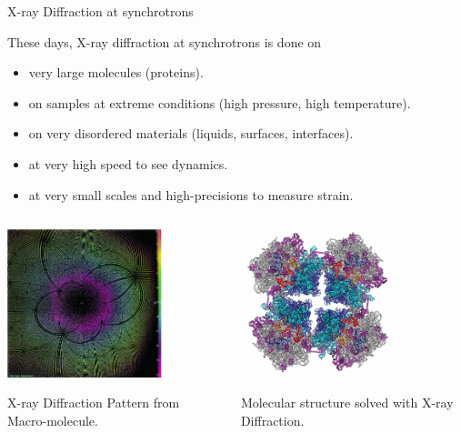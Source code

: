 \begin{slide}{X-ray Diffraction at synchrotrons}

  \begin{cenpage}{110mm}
    These days, X-ray diffraction at synchrotrons is done on

     \begin{itemize}
     \item very large molecules (proteins).
     \item on samples at extreme conditions (high pressure, high
       temperature).
     \item on very disordered materials (liquids, surfaces, interfaces).
     \item at very high speed to see dynamics.
     \item at very small scales and high-precisions to measure strain.
       \end{itemize}

     \end{cenpage}
     
       \begin{columns}[T]
         \begin{column}{65mm}
           \includegraphics[width=45mm]{figs/images/XRD_MacroPattern}

           X-ray Diffraction Pattern from Macro-molecule.
           
         \end{column}
         \begin{column}{75mm}
           \includegraphics[width=45mm]{figs/images/XRD_MacroMolecule}

           Molecular structure solved with X-ray Diffraction.

         \end{column}         

     \end{columns}
 \vfill
\end{slide}     
